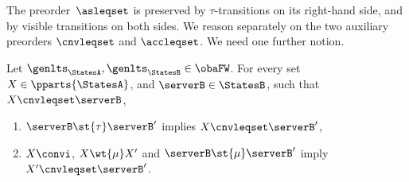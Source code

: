 The preorder~$\asleqset$ is preserved by $\tau$-transitions on
its right-hand side, and by visible transitions
on both sides.
We reason separately on the two auxiliary
preorders $\cnvleqset$ and $\accleqset$.
We need one
further notion.
\begin{lemma}
  \label{lem:bhvleqone-preserved}
  Let $\genlts_\StatesA, \genlts_\StatesB \in \obaFW$.
  For every set $X \in \pparts{ \StatesA }$, and
  $\serverB \in \StatesB$, such that
  $X \cnvleqset \serverB$,
  \begin{enumerate}
  \item\label{pt:bhvleqone-preserved-by-tau}
    $\serverB \st{ \tau } \serverB'$ implies $X \cnvleqset \serverB'$,
  \item\label{pt:bhvleqone-preserved-by-mu}
    $X \convi$, $X \wt{\mu} X'$ and $\serverB \st{\mu} \serverB'$ imply $X' \cnvleqset \serverB'$.
  \end{enumerate}
\end{lemma}


